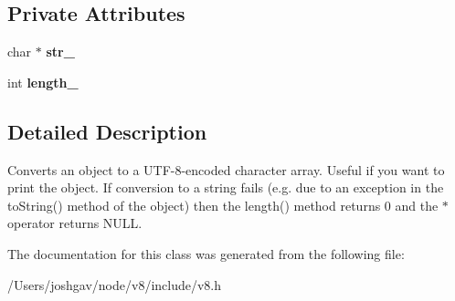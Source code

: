 \subsection*{Private Attributes}
\begin{DoxyCompactItemize}
\item 
char $\ast$ {\bfseries str\+\_\+}\hypertarget{classv8_1_1_string_1_1_utf8_value_a474e69f2de2bedc21bc99da7f834b9a4}{}\label{classv8_1_1_string_1_1_utf8_value_a474e69f2de2bedc21bc99da7f834b9a4}

\item 
int {\bfseries length\+\_\+}\hypertarget{classv8_1_1_string_1_1_utf8_value_a978cd108332a3fc9956f08eadb18c080}{}\label{classv8_1_1_string_1_1_utf8_value_a978cd108332a3fc9956f08eadb18c080}

\end{DoxyCompactItemize}


\subsection{Detailed Description}
Converts an object to a U\+T\+F-\/8-\/encoded character array. Useful if you want to print the object. If conversion to a string fails (e.\+g. due to an exception in the to\+String() method of the object) then the length() method returns 0 and the $\ast$ operator returns N\+U\+LL. 

The documentation for this class was generated from the following file\+:\begin{DoxyCompactItemize}
\item 
/\+Users/joshgav/node/v8/include/v8.\+h\end{DoxyCompactItemize}
